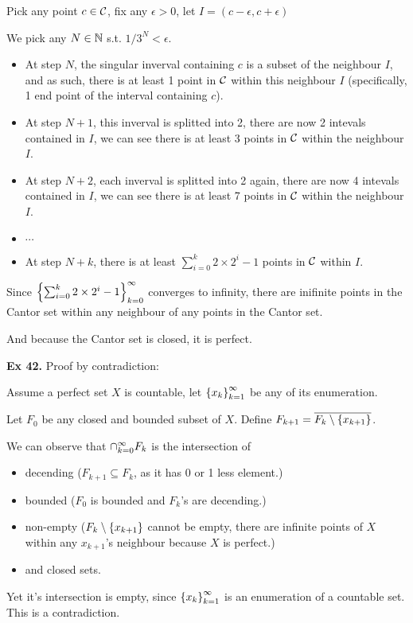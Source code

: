 Pick any point $c \in \mathcal{C}$, fix any $\epsilon > 0$, let $I = (c-\epsilon, c+\epsilon)$

We pick any $N\in \mathbb{N}$ s.t. $1/3^N < \epsilon$.

\begin{itemize}
    \item[] At step $N$, the singular inverval containing $c$ is a subset of the neighbour $I$, and as such, there is at least 1 point in $\mathcal{C}$ within this neighbour $I$ (specifically, 1 end point of the interval containing $c$).
    \item[] At step $N+1$, this inverval is splitted into 2, there are now 2 intevals contained in $I$, we can see there is at least 3 points in $\mathcal{C}$ within the neighbour $I$.
    \item[] At step $N+2$, each inverval is splitted into 2 again, there are now 4 intevals contained in $I$, we can see there is at least 7 points in $\mathcal{C}$ within the neighbour $I$.
    \item[] $\cdots$
    \item[] At step $N+k$, there is at least $\sum_{i=0}^{k} 2\times2^i - 1$ points in $\mathcal{C}$ within $I$.
\end{itemize}

Since $\left\{\sum_{i=0}^{k} 2\times2^i - 1\right\}_{k=0}^{\infty}$ converges to infinity, there are inifinite points in the Cantor set within any neighbour of any points in the Cantor set.

And because the Cantor set is closed, it is perfect.


\noindent {}\textbf{Ex 42.} \label{ex:2_42}
Proof by contradiction:

Assume a perfect set $X$ is countable, let $\left\{x_k\right\}_{k=1}^{\infty}$ be any of its enumeration.

Let $F_0$ be any closed and bounded subset of $X$. Define $F_{k+1} = \overline{F_k \setminus \left\{x_{k+1}\right\}}$.

We can observe that $\cap_{k=0}^\infty F_k$ is the intersection of 
\begin{itemize}
    \item decending ($F_{k+1}\subseteq F_k$, as it has 0 or 1 less element.)
    \item bounded ($F_0$ is bounded and $F_k$'s are decending.)
    \item non-empty ($F_k \setminus \left\{x_{k+1}\right\}$ cannot be empty, there are infinite points of $X$ within any $x_{k+1}$'s neighbour because $X$ is perfect.)
    \item and closed sets.
\end{itemize}
Yet it's intersection is empty, since $\left\{x_k\right\}_{k=1}^{\infty}$ is an enumeration of a countable set. This is a contradiction.


